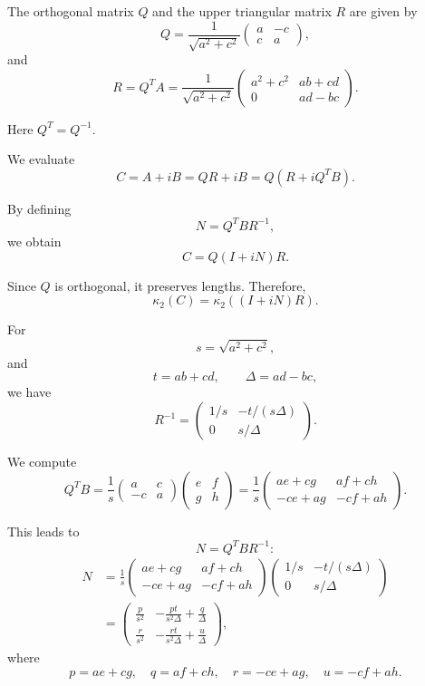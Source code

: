 \documentclass[11pt, reqno, a4paper]{amsart}
\theoremstyle{plain}
\theoremstyle{definition}
\theoremstyle{remark}
\numberwithin{equation}{section}
\begin{document}
The orthogonal matrix $Q$ and the upper triangular matrix $R$ are given by
\[
Q=
\frac{1}{\sqrt{a^2+c^2}}
\begin{pmatrix}
a&-c\\
c&a
\end{pmatrix},
\]
and
\[
R=Q^TA
=
\frac{1}{\sqrt{a^2+c^2}}
\begin{pmatrix}
a^2+c^2&ab+cd\\
0&ad-bc
\end{pmatrix}.
\]

Here $Q^T=Q^{-1}$.

We evaluate
\[
C=A+iB=QR+iB=Q(R+iQ^TB).
\]

By defining
\[
N=Q^TBR^{-1},
\]
we obtain
\[
C=Q(I+iN)R.
\]

Since $Q$ is orthogonal, it preserves lengths. Therefore,
\[
\kappa_2(C)=\kappa_2((I+iN)R).
\]

For
\[
s=\sqrt{a^2+c^2},
\]
and
\[
t=ab+cd,\qquad \Delta=ad-bc,
\]
we have
\[
R^{-1}
=
\begin{pmatrix}
1/s&-t/(s\Delta)\\
0&s/\Delta
\end{pmatrix}.
\]

We compute
\[
Q^TB
=
\frac{1}{s}
\begin{pmatrix}
a&c\\
-c&a
\end{pmatrix}
\begin{pmatrix}
e&f\\
g&h
\end{pmatrix}
=
\frac{1}{s}
\begin{pmatrix}
ae+cg&af+ch\\
-ce+ag&-cf+ah
\end{pmatrix}.
\]

This leads to
\[
N=Q^TBR^{-1}:
\]
\begin{align*}
N
&=
\frac{1}{s}
\begin{pmatrix}
ae+cg&af+ch\\
-ce+ag&-cf+ah
\end{pmatrix}
\begin{pmatrix}
1/s&-t/(s\Delta)\\
0&s/\Delta
\end{pmatrix}\\
&=
\begin{pmatrix}
\frac{p}{s^2}&-\frac{pt}{s^2\Delta}+\frac{q}{\Delta}\\[4pt]
\frac{r}{s^2}&-\frac{rt}{s^2\Delta}+\frac{u}{\Delta}
\end{pmatrix},
\end{align*}
where
\[
p=ae+cg,\quad q=af+ch,\quad
r=-ce+ag,\quad u=-cf+ah.
\]
\end{document}
